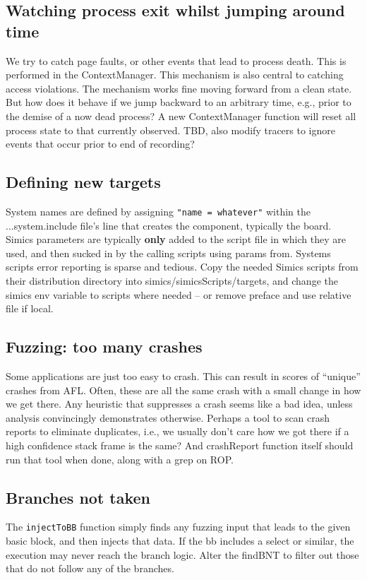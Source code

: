 \documentclass[titlepage]{article}
\begin{document}
\begin{appendices}
\subsection{Watching process exit whilst jumping around time}
We try to catch page faults, or other events that lead to process death.  This is performed in the ContextManager.  
This mechanism is also central to catching access violations.  The mechanism works fine moving forward from a clean state.  But
how does it behave if we jump backward to an arbitrary time, e.g., prior to the demise of a now dead process?  A new ContextManager function
will reset all process state to that currently observed.  TBD, also modify tracers to ignore events that occur prior to end of recording?

\subsection{Defining new targets}
System names are defined by assigning {\tt "name = whatever"} within the ...system.include file's line that creates the component, typically the board.
Simics parameters are typically \textbf{only} added to the script file in which they are used, and then sucked in by the calling scripts using params from.
Systems scripts error reporting is sparse and tedious.   Copy the needed Simics scripts from their distribution directory into simics/simicsScripts/targets,
and change the simics env variable to scripts where needed -- or remove preface and use relative file if local. 

\subsection{Fuzzing: too many crashes}
Some applications are just too easy to crash.  This can result in scores of ``unique'' crashes from AFL.  Often, these are all the same
crash with a small change in how we get there.  Any heuristic that suppresses a crash seems like a bad idea, unless analysis convincingly demonstrates otherwise.
Perhaps a tool to scan crash reports to eliminate duplicates, i.e., we usually don't care how we got there if a high confidence stack frame is the same?
And crashReport function itself should run that tool when done, along with a grep on ROP.

\subsection{Branches not taken}
The {\tt injectToBB} function simply finds any fuzzing input that leads to the given basic block, and then injects that data.
If the bb includes a select or similar, the execution may never reach the branch logic.  Alter the findBNT to filter out those that do not
follow any of the branches.


\end{appendices}
\end{document}
